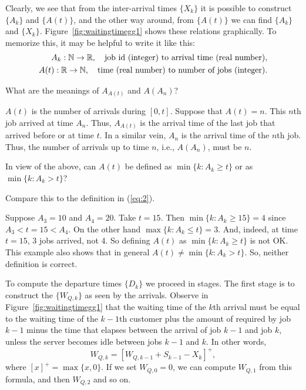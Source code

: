 Clearly, we see that from the inter-arrival times $\{X_k\}$ it is
possible to construct $\{A_k\}$ and $\{A(t)\}$, and the other way
around, from $\{A(t)\}$ we can find $\{A_k\}$ and $\{X_k\}$.
Figure~\ref{fig:waitingtimegg1} shows these relations graphically. To
memorize this, it may be helpful to write it like this:
\begin{align*}
  A_k : \mathbb{N} \to \mathbb{R}, \quad{\text{job id (integer) to arrival time (real number)}}, \\
  A(t) : \mathbb{R}\to \mathbb{N}, \quad{\text{time (real number) to number of jobs (integer)}}.
\end{align*}

\begin{exercise}
 What are  the meanings of $A_{A(t)}$ and $A(A_n)$?
 \begin{solution}
  $A(t)$ is the number of arrivals during $[0,t]$. Suppose that
    $A(t) = n$. This $n$th job arrived at time $A_n$. Thus, $A_{A(t)}$
    is the arrival time of the last job that arrived before or at time
    $t$. In a similar vein, $A_n$ is the arrival time of the $n$th
    job. Thus, the number of arrivals up to time $n$, i.e., $A(A_n)$,
    must be $n$.
  \end{solution}
\end{exercise}

\begin{exercise}\label{ex:22}
  In view of the above, can  $A(t)$ be defined as $\min\{k : A_k \geq t\}$ or as $\min\{k: A_k > t\}$?
  \begin{hint}
Compare this to the definition in (\ref{eq:2}).
  \end{hint}
  \begin{solution}
    Suppose $A_3 = 10$ and $A_4 = 20$. Take $t=15$. Then
    $\min\{k : A_k \geq 15\} = 4$ since $A_3 < t=15 < A_4$. On the
    other hand $\max\{k : A_k \leq t\} = 3$. And, indeed, at time $t=15$, 3 jobs arrived, not 4. So defining $A(t)$ as $\min\{k : A_k \geq t\}$ is not OK.  This example also shows that in general $A(t) \neq \min\{k : A_k > t\}$. So, neither definition is correct. 

  \end{solution}
\end{exercise}

To compute the departure times $\{D_k\}$ we proceed in stages.
The first stage is to construct the  $\{W_{Q,k}\}$ as seen by the arrivals.
Observe in Figure~\ref{fig:waitingtimegg1} that the waiting time of the $k$th arrival must be equal to the waiting time of the $k-1$th customer plus the amount of  required by job $k-1$ minus the time that elapses between the arrival of job $k-1$ and job $k$, unless the server becomes idle between jobs $k-1$ and $k$.
In other words,
\begin{equation}\label{eq:56}
  W_{Q,k} = [W_{Q,k-1} + S_{k-1}-X_k]^+,
\end{equation}
where $[x]^+ = \max\{x, 0\}$. If we set $W_{Q,0}=0$, we can compute
$W_{Q,1}$ from this formula, and then $W_{Q,2}$ and so on.

